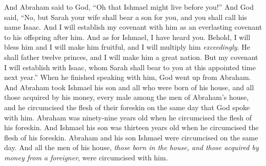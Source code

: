 \begin{biblechapter}
\verse And Abraham said to God, “Oh that Ishmael might live before you!”
\verse And God said, “No, but Sarah your wife shall bear a son for you, and you shall call his name Isaac. And I will establish my covenant with him as an everlasting covenant to his offspring after him.
\verse And as for Ishmael, I have heard you. Behold, I will bless him and I will make him fruitful, and I will multiply him \textit{exceedingly}. He shall father twelve princes, and I will make him a great nation.
\verse But my covenant I will establish with Isaac, whom Sarah shall bear to you at this appointed time next year.”
\verse When he finished speaking with him, God went up from Abraham.
\verse And Abraham took Ishmael his son and all who were born of his house, and all those acquired by his money, every male among the men of Abraham’s house, and he circumcised the flesh of their foreskin on the same day that God spoke with him.
\verse Abraham was ninety-nine years old when he circumcised the flesh of his foreskin.
\verse And Ishmael his son was thirteen years old when he circumcised the flesh of his foreskin.
\verse Abraham and his son Ishmael were circumcised on the same day.
\verse And all the men of his house, \textit{those born in the house, and those acquired by money from a foreigner}, were circumcised with him.
\end{biblechapter}

